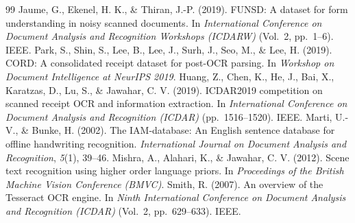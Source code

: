 \begin{thebibliography}{99}
 Jaume, G., Ekenel, H. K., \& Thiran, J.-P. (2019). FUNSD: A dataset for form understanding in noisy scanned documents. In \textit{International Conference on Document Analysis and Recognition Workshops (ICDARW)} (Vol.~2, pp.~1--6). IEEE.
 Park, S., Shin, S., Lee, B., Lee, J., Surh, J., Seo, M., \& Lee, H. (2019). CORD: A consolidated receipt dataset for post-OCR parsing. In \textit{Workshop on Document Intelligence at NeurIPS 2019}.
 Huang, Z., Chen, K., He, J., Bai, X., Karatzas, D., Lu, S., \& Jawahar, C. V. (2019). ICDAR2019 competition on scanned receipt OCR and information extraction. In \textit{International Conference on Document Analysis and Recognition (ICDAR)} (pp.~1516--1520). IEEE.
 Marti, U.-V., \& Bunke, H. (2002). The IAM-database: An English sentence database for offline handwriting recognition. \textit{International Journal on Document Analysis and Recognition}, \textit{5}(1), 39--46.
 Mishra, A., Alahari, K., \& Jawahar, C. V. (2012). Scene text recognition using higher order language priors. In \textit{Proceedings of the British Machine Vision Conference (BMVC)}.
 Smith, R. (2007). An overview of the Tesseract OCR engine. In \textit{Ninth International Conference on Document Analysis and Recognition (ICDAR)} (Vol.~2, pp.~629--633). IEEE.
\end{thebibliography}
\endgroup
